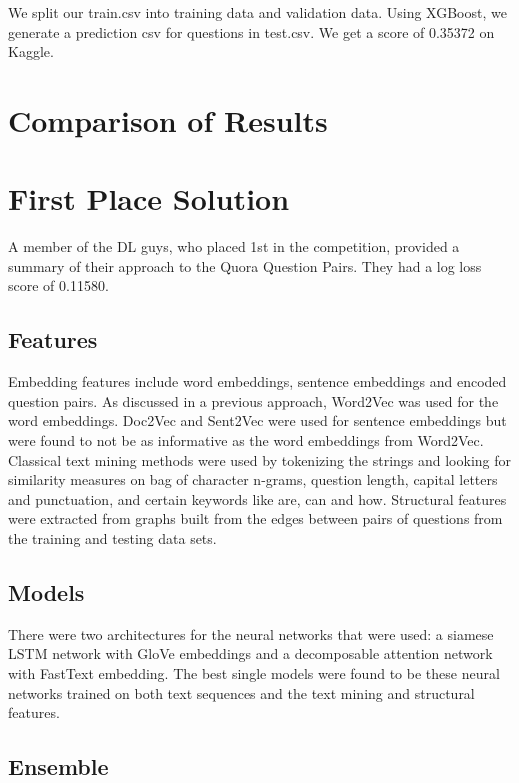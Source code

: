 \documentclass{article}
\begin{document}
We split our train.csv into training data and validation data. Using XGBoost, we generate a prediction csv for questions in test.csv. We get a score of 0.35372 on Kaggle.

\section{Comparison of Results}

\section{First Place Solution}

A member of the DL guys, who placed 1st in the competition, provided a summary
of their approach to the Quora Question Pairs. They had a log loss score of
0.11580.

\subsection{Features}

Embedding features include word embeddings, sentence embeddings and encoded
question pairs. As discussed in a previous approach, Word2Vec was used for the
word embeddings. Doc2Vec and Sent2Vec were used for sentence embeddings but
were found to not be as informative as the word embeddings from Word2Vec. Classical text mining methods were used by tokenizing the strings and looking
for similarity measures on bag of character n-grams, question length, capital
letters and punctuation, and certain keywords like are, can and how. Structural
features were extracted from graphs built from the edges between pairs of
questions from the training and testing data sets.

\subsection{Models}

There were two architectures for the neural networks that were used: a siamese
LSTM network with GloVe embeddings and a decomposable attention network with
FastText embedding. The best single models were found to be these neural
networks trained on both text sequences and the text mining and structural
features.

\subsection{Ensemble}
\end{document}
